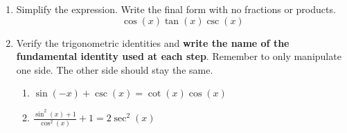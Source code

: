 


\begin{enumerate}
\item  Simplify the expression.  Write the final form with no fractions or products.
$$\cos(x)\tan(x)\csc(x)$$

\vfill

\item Verify the trigonometric identities and \textbf{write the name of the fundamental identity used at each step}. Remember to only manipulate one side.  The other side should stay the same.

\begin{enumerate}
\item  $\sin(-x)+\csc(x)=\cot(x)\cos(x)$\vfill
\vfill
\vfill


\newpage
\item  $\displaystyle \frac{\sin^2(x)+1}{\cos^2(x)}+1=2\sec^2(x)$\vfill
\end{enumerate}

\end{enumerate}


